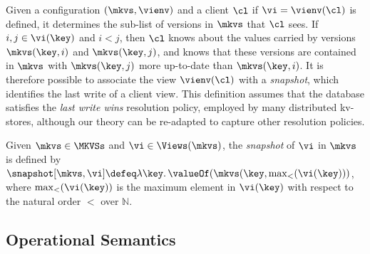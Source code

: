 %
%
Given a configuration $(\mkvs, \vienv)$ and a client $\cl$
if $\vi = \vienv(\cl)$ is defined, it determines the sub-list of versions in $\mkvs$ that $\cl$ sees.
If $i,j \in \vi(\key)$ and $i < j$, then $\cl$ knows about the values 
carried by versions $\mkvs(\key, i)$ and  $\mkvs(\key, j)$, 
and  knows that these versions are contained in $\mkvs$ with $\mkvs(\key, j)$ more 
up-to-date than $\mkvs(\key, i)$. 
It is therefore possible to associate the view $\vienv(\cl)$ with a \emph{snapshot}, 
which identifies the last write of a client view. 
This definition assumes that the database satisfies the \emph{last write wins}
resolution policy, employed by many distributed kv-stores,  
although our theory can be re-adapted to capture other resolution policies. 

\begin{definition}[Snapshots]
\label{def:snapshot}
Given $\mkvs \in \MKVSs$ and $\vi \in \Views(\mkvs)$, the \emph{snapshot} of $\vi$ in 
$\mkvs$ is defined by  $\snapshot[\mkvs, \vi] \defeq \lambda \key \ldotp \valueOf(\mkvs(\key, \max_{<}(\vi(\key)))$, 
where $\max_{<}(\vi(\key))$ is the maximum element in $\vi(\key)$ with respect to the natural 
order $<$ over $\mathbb{N}$.
\end{definition}


\subsection{Operational Semantics}

